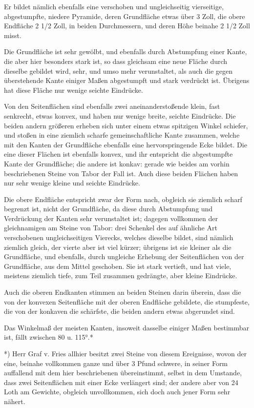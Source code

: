 \documentclass[a4paper, 11pt, oneside, german]{article}
\begin{document}
Er bildet nämlich ebenfalls eine verschoben und ungleichseitig vierseitige, abgestumpfte, niedere Pyramide, deren Grundfläche etwas über 3 Zoll, die obere Endfläche 2 1/2 Zoll, in beiden Durchmessern, und deren Höhe beinahe 2 1/2 Zoll misst.

Die Grundfläche ist sehr gewölbt, und ebenfalls durch Abstumpfung einer Kante, die aber hier besonders stark ist, so dass gleichsam eine neue Fläche durch dieselbe gebildet wird, sehr, und umso mehr verunstaltet, als auch die gegen überstehende Kante einiger Maßen abgestumpft und stark verdrückt ist. Übrigens hat diese Fläche nur wenige seichte Eindrücke.

Von den Seitenflächen sind ebenfalls zwei aneinanderstoßende klein, fast senkrecht, etwas konvex, und haben nur wenige breite, seichte Eindrücke. Die beiden andern größeren erheben sich unter einem etwas spitzigen Winkel schiefer, und stoßen in eine ziemlich scharfe gemeinschaftliche Kante zusammen, welche mit den Kanten der Grundfläche ebenfalls eine hervorspringende Ecke bildet. Die eine dieser Flächen ist ebenfalls konvex, und ihr entspricht die abgestumpfte Kante der Grundfläche; die andere ist konkav: gerade wie beides am vorhin beschriebenen Steine von Tabor der Fall ist. Auch diese beiden Flächen haben nur sehr wenige kleine und seichte Eindrücke.

Die obere Endfläche entspricht zwar der Form nach, obgleich sie ziemlich scharf begrenzt ist, nicht der Grundfläche, da diese durch Abstumpfung und Verdrückung der Kanten sehr verunstaltet ist; dagegen vollkommen der gleichnamigen am Steine von Tabor: drei Schenkel des auf ähnliche Art verschobenen ungleichseitigen Vierecks, welches dieselbe bildet, sind nämlich ziemlich gleich, der vierte aber ist viel kürzer; übrigens ist sie kleiner als die Grundfläche, und ebenfalls, durch ungleiche Erhebung der Seitenflächen von der Grundfläche, aus dem Mittel geschoben. Sie ist stark vertieft, und hat viele, meistens ziemlich tiefe, zum Teil zusammen gedrängte, aber kleine Eindrücke.

Auch die oberen Endkanten stimmen an beiden Steinen darin überein, dass die von der konvexen Seitenfläche mit der oberen Endfläche gebildete, die stumpfeste, die von der konkaven die schärfste, die beiden andern etwas abgerundet sind.

Das Winkelmaß der meisten Kanten, insoweit dasselbe einiger Maßen bestimmbar ist, fällt zwischen 80 u. 115°.*

*) Herr Graf v. Fries allhier besitzt zwei Steine von diesem Ereignisse, wovon der eine, beinahe vollkommen ganze und über 3 Pfund schwere, in seiner Form auffallend mit dem hier beschriebenen übereinstimmt, selbst in dem Umstande, dass zwei Seitenflächen mit einer Ecke verlängert sind; der andere aber von 24 Loth am Gewichte, obgleich unvollkommen, sich doch auch jener Form sehr nähert.
\end{document}
